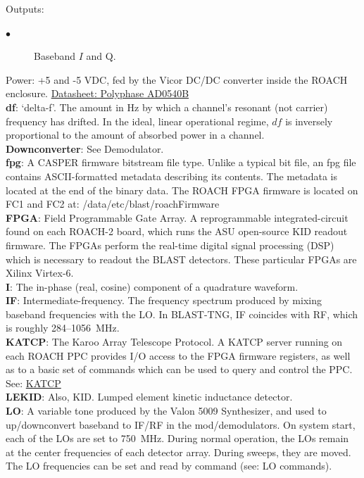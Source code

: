 Outputs:
\begin{description}
  \item[$\bullet$] Baseband $I$ and Q.
  \end{description}
Power: +5 and -5 VDC, fed by the Vicor DC/DC converter inside the ROACH enclosure.
\href{https://polyphasemicrowave.com/media/AD0540B.pdf}{Datasheet: Polyphase AD0540B}\\
\textbf{df}: ‘delta-f’. The amount in Hz by which a channel’s resonant (not carrier) frequency has drifted. In the ideal, linear operational regime, $df$ is inversely proportional to the amount of absorbed power in a channel.\\
\textbf{Downconverter}: See Demodulator. \\
\textbf{fpg}: A CASPER firmware bitstream file type. Unlike a typical bit file, an fpg file contains ASCII-formatted metadata describing its contents. The metadata is located at the end of the binary data. The ROACH FPGA firmware is located on FC1 and FC2 at: /data/etc/blast/roachFirmware\\
\textbf{FPGA}: Field Programmable Gate Array. A reprogrammable integrated-circuit found on each ROACH-2 board, which runs the ASU open-source KID readout firmware. The FPGAs perform the real-time digital signal processing (DSP) which is necessary to readout the BLAST detectors. These particular FPGAs are Xilinx Virtex-6.\\
\textbf{I}: The in-phase (real, cosine) component of a quadrature waveform.\\
\textbf{IF}: Intermediate-frequency. The frequency spectrum produced by mixing baseband frequencies with the LO\@. In BLAST-TNG, IF coincides with RF, which is roughly 284--1056~MHz.\\
\textbf{KATCP}: The Karoo Array Telescope Protocol. A KATCP server running on each ROACH PPC provides I/O access to the FPGA firmware registers, as well as to a basic set of commands which can be used to query and control the PPC.\\
See: \href{https://casper.ssl.berkeley.edu/wiki/KATCP}{KATCP}\\
\textbf{LEKID}: Also, KID\@. Lumped element kinetic inductance detector.\\
\textbf{LO}: A variable tone produced by the Valon 5009 Synthesizer, and used to up/downconvert baseband to IF/RF in the mod/demodulators. On system start, each of the LOs are set to 750~MHz. During normal operation, the LOs remain at the center frequencies of each detector array. During sweeps, they are moved. The LO frequencies can be set and read by command (see: LO commands).\\
